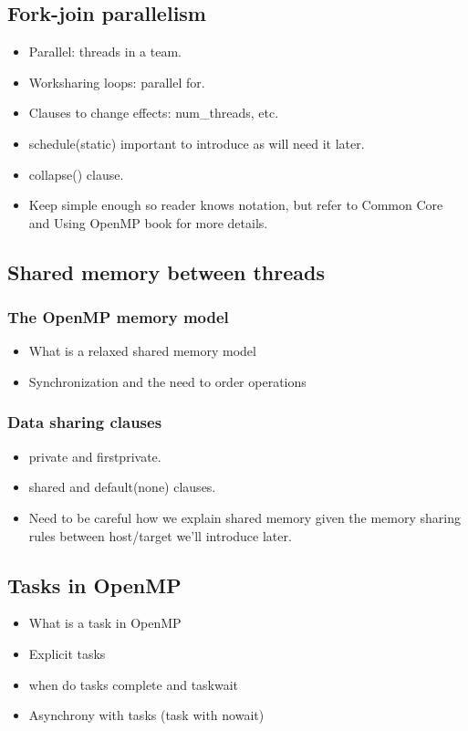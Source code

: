 \subsection{Fork-join parallelism}
\label{ssec:fork_join}
\begin{itemize}
  \item Parallel: threads in a team.
  \item Worksharing loops: parallel for.
  \item Clauses to change effects: num\_threads, etc.
  \item schedule(static) important to introduce as will need it later.
  \item collapse() clause.
  \item Keep simple enough so reader knows notation, but refer to Common Core and Using OpenMP book for more details.
\end{itemize}

\subsection{Shared memory between threads}
\subsubsection{The OpenMP memory model}
\begin{itemize}
  \item What is a relaxed shared memory model
  \item Synchronization and the need to order operations
\end{itemize}
\subsubsection{Data sharing clauses}
\label{sssec:data_sharing}
\begin{itemize}
  \item private and firstprivate.
  \item shared and default(none) clauses.
  \item Need to be careful how we explain shared memory given the memory sharing rules between host/target we’ll introduce later.
\end{itemize}

\subsection{Tasks in OpenMP}
\begin{itemize}
   \item What is a task in OpenMP
   \item Explicit tasks 
   \item when do tasks complete and taskwait
   \item Asynchrony with tasks (task with nowait)
\end{itemize}

